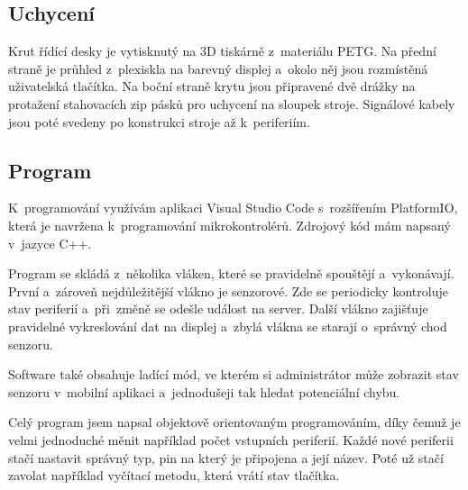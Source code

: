 \subsection{Uchycení}
Krut řídící desky je vytisknutý na 3D tiskárně z~materiálu PETG.
Na přední straně je průhled z~plexiskla na barevný displej a~okolo něj jsou rozmístěná uživatelská tlačítka.
Na boční straně krytu jsou připravené dvě drážky na protažení stahovacích zip pásků pro uchycení na sloupek stroje.
Signálové kabely jsou poté svedeny po konstrukci stroje až k~periferiím.


\subsection{Program}
K~programování využívám aplikaci Visual Studio Code s~rozšířením PlatformIO, která je navržena k~programování mikrokontrolérů. 
Zdrojový kód mám napsaný v~jazyce C++.

Program se skládá z~několika vláken, které se pravidelně spouštějí a~vykonávají.
První a~zároveň nejdůležitější vlákno je senzorové.
Zde se periodicky kontroluje stav periferií a~při~změně se odešle událost na server.
Další vlákno zajišťuje pravidelné vykreslování dat na displej a~zbylá vlákna se starají o~správný chod senzoru.

Software také obsahuje ladící mód, ve kterém si administrátor může zobrazit stav senzoru v~mobilní aplikaci a~jednodušeji tak hledat potenciální chybu.

Celý program jsem napsal objektově orientovaným programováním, díky čemuž je velmi jednoduché měnit například počet vstupních periferií.
Každé nové periferii stačí nastavit správný typ, pin na který je připojena a její název.
Poté už stačí zavolat například vyčítací metodu, která vrátí stav tlačítka.


